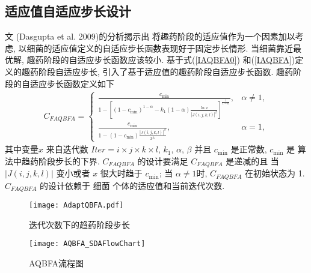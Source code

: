 \subsection{适应值自适应步长设计}
文 (Dasgupta et al. 2009)的分析揭示出 将趣药阶段的适应值作为一个因素加以考虑, 以细菌的适应值定义的自适应步长函数表现好于固定步长情形.
当细菌靠近最优解, 趣药阶段的自适应步长函数应该较小. 基于式(\ref{IAQBFA0}) 和(\ref{IAQBFA})定义的趣药阶段自适应步长, 引入了基于适应值的趣药阶段自适应步长函数.
趣药阶段的自适应步长函数定义如下
\begin{align}\label{FAQBFA}
C_{FAQBFA}
 =
\left\{
  \begin{array}{ll}
  \frac{c_{\min}}{1-\left[(1-c_{\min})^{1-\alpha}-k_1(1-\alpha)\frac{\ln x}{|J(i,j,k,l)|^{\beta}}\right]^{\frac{1}{1-\alpha}}},&  \alpha\neq 1,\\
  \frac{c_{\min}}{1-(1-c_{\min})\frac{|J(i,j,k,l)|^{\beta}}{x^{k_1}}},&  \alpha= 1,
  \end{array}
  \right.
\end{align}
其中变量$x$ 来自迭代数 $Iter=i\times j\times k \times l$, $k_1$, $\alpha$, $\beta$ 并且 $c_{\min}$ 是正常数, $c_{\min}$ 是 算法中趋药阶段步长的下界.
$C_{FAQBFA}$ 的设计要满足 $C_{FAQBFA}$ 是递减的且 当 $|J(i,j,k,l)|$ 变小或者 $x$ 很大时趋于 $c_{\min}$;
当 $\alpha\neq 1$时, $C_{FAQBFA}$ 在初始状态为 1. $C_{FAQBFA}$ 的设计依赖于 细菌 个体的适应值和当前迭代次数.
\begin{figure}[!tbp]
\begin{center}
    \texttt{[image: AdaptQBFA.pdf]}
    \caption{迭代次数下的趋药阶段步长}
    \label{AdaptQBFA:fig1}
    \vspace{0.5em}\centering
\end{center}
\end{figure}
\begin{figure*}[tb]
    \begin{center}
     \texttt{[image: AQBFA\_SDAFlowChart]}
      \caption{AQBFA流程图}
      \label{fig:FlowchartAQBFA}
    \end{center}
\end{figure*}
